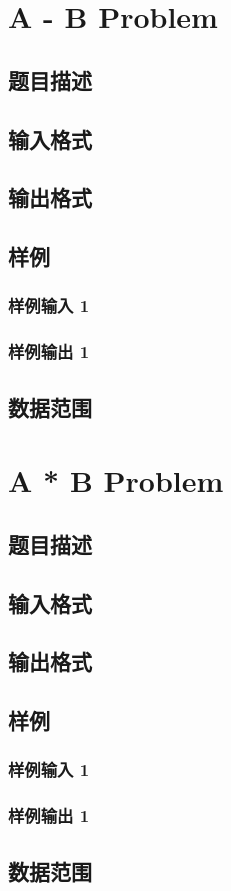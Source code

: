\documentclass{article}
\begin{document}
  \newpage

  \section{A - B Problem}

  \subsection{题目描述}

  \subsection{输入格式}

  \subsection{输出格式}

  \subsection{样例}

  \subsubsection{样例输入 1}

  \subsubsection{样例输出 1}

  \subsection{数据范围}

  \newpage

  \section{A * B Problem}

  \subsection{题目描述}

  \subsection{输入格式}

  \subsection{输出格式}

  \subsection{样例}

  \subsubsection{样例输入 1}

  \subsubsection{样例输出 1}

  \subsection{数据范围}
\end{document}
